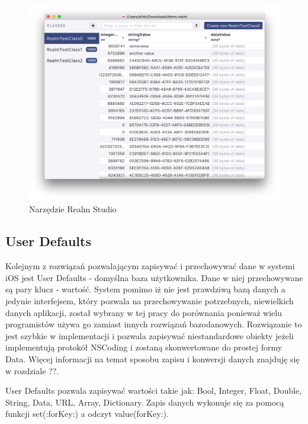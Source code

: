 \begin{figure}[h]
	\includegraphics[width=\linewidth]{img/RealmStudio.png}
	\caption{Narzędzie Realm Studio}
	\label{fig: RealmStudio}
\end{figure}

\subsection{User Defaults}

Kolejnym z rozwiązań pozwalającym zapisywać i przechowywać dane w systemi iOS jest User Defaults - domyślna baza użytkownika. Dane w niej przechowywane są pary klucz - wartość. System pomimo iż nie jest prawdziwą bazą danych a jedynie interfejsem, który pozwala na przechowywanie potrzebnych, niewielkich danych aplikacji, został wybrany w tej pracy do porównania ponieważ wielu programistów używa go zamiast innych rozwiązań bazodanowych. Rozwiązanie to jest szybkie w implementacji i pozwala zapisywać niestandardowe obiekty jeżeli implementują protokół NSCoding i zostaną skonwertowane do prostej formy Data. Więcej informacji na temat sposobu zapisu i konwersji danych znajduję się w rozdziale ??. \par
  
User Defaults pozwala zapisywać wartości takie jak: Bool, Integer, Float, Double, String, Data, URL, Array, Dictionary. Zapis danych wykonuje się za pomocą funkcji set(:forKey:) a odczyt value(forKey:). 
